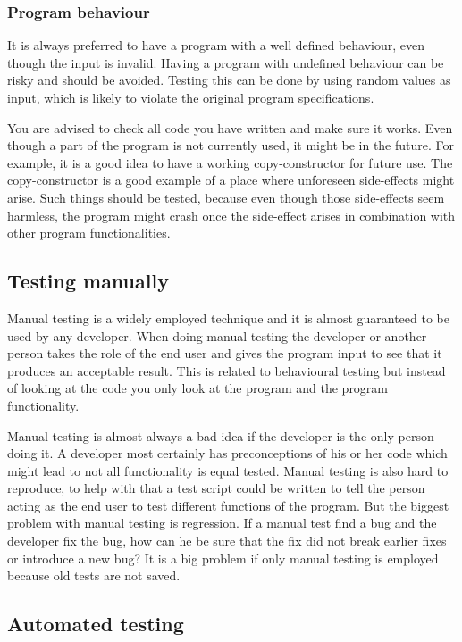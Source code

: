 \documentclass[11pt,a4paper,twoside]{article}
\begin{document}
\subsubsection{Program behaviour}

It is always preferred to have a program with a well defined behaviour, even
though the input is invalid. Having a program with undefined behaviour can be
risky and should be avoided. Testing this can be done by using random values as
input, which is likely to violate the original program specifications.

You are advised to check all code you have written and make sure it works. Even
though a part of the program is not currently used, it might be in the future.
For example, it is a good idea to have a working copy-constructor for future
use. The copy-constructor is a good example of a place where unforeseen
side-effects might arise. Such things should be tested, because even though
those side-effects seem harmless, the program might crash once the side-effect
arises in combination with other program functionalities.

\subsection{Testing manually}

Manual testing is a widely employed technique and it is almost guaranteed to be
used by any developer. When doing manual testing the developer or another
person takes the role of the end user and gives the program input to see that
it produces an acceptable result. This is related to behavioural testing but
instead of looking at the code you only look at the program and the program
functionality.

Manual testing is almost always a bad idea if the developer is the only person
doing it. A developer most certainly has preconceptions of his or her code
which might lead to not all functionality is equal tested. Manual testing is
also hard to reproduce, to help with that a test script could be written to
tell the person acting as the end user to test different functions of the
program. But the biggest problem with manual testing is regression. If a manual
test find a bug and the developer fix the bug, how can he be sure that the fix
did not break earlier fixes or introduce a new bug? It is a big problem if only
manual testing is employed because old tests are not saved.

\subsection{Automated testing}
\end{document}
